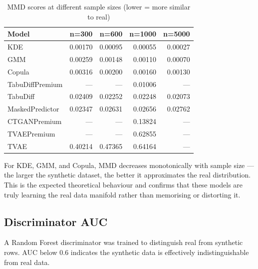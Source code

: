 \documentclass[12pt,a4paper]{article}
\begin{document}
\begin{table}[H]
\centering
\caption{MMD scores at different sample sizes (lower = more similar to real)}
\label{tab:mmd}
\renewcommand{\arraystretch}{1.25}
\begin{tabular}{lrrrr}
\toprule
\textbf{Model} & \textbf{n=300} & \textbf{n=600} & \textbf{n=1000} & \textbf{n=5000} \\
\midrule
KDE             & 0.00170 & 0.00095 & 0.00055 & 0.00027 \\
GMM             & 0.00259 & 0.00148 & 0.00110 & 0.00070 \\
Copula          & 0.00316 & 0.00200 & 0.00160 & 0.00130 \\
TabuDiffPremium & ---     & ---     & 0.01006 & ---     \\
TabuDiff        & 0.02409 & 0.02252 & 0.02248 & 0.02073 \\
MaskedPredictor & 0.02347 & 0.02631 & 0.02656 & 0.02762 \\
CTGANPremium    & ---     & ---     & 0.13824 & ---     \\
TVAEPremium     & ---     & ---     & 0.62855 & ---     \\
TVAE            & 0.40214 & 0.47365 & 0.64164 & ---     \\
\bottomrule
\end{tabular}
\end{table}

For KDE, GMM, and Copula, MMD decreases monotonically with sample size --- the larger the synthetic dataset, the better it approximates the real distribution. This is the expected theoretical behaviour and confirms that these models are truly learning the real data manifold rather than memorising or distorting it.

\subsection{Discriminator AUC}

A Random Forest discriminator was trained to distinguish real from synthetic rows. AUC below 0.6 indicates the synthetic data is effectively indistinguishable from real data.
\end{document}
